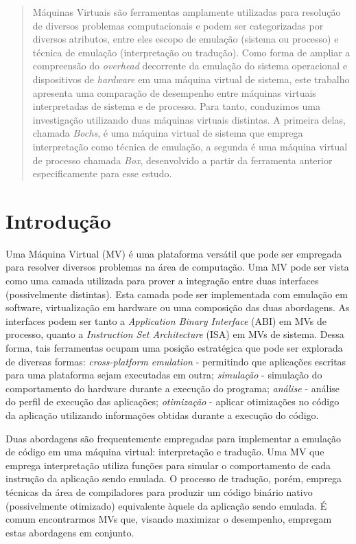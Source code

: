 \documentclass[11pt,twoside]{article}
\begin{document}
\begin{abstract} 
Máquinas Virtuais são ferramentas amplamente utilizadas para resolução de
diversos problemas computacionais e podem ser categorizadas por diversos
atributos, entre eles escopo de emulação (sistema ou processo) e técnica de
emulação (interpretação ou tradução). Como forma de ampliar a compreensão do
\emph{overhead} decorrente da emulação do sistema operacional e dispositivos de
\emph{hardware} em uma máquina virtual de sistema, este trabalho apresenta uma
comparação de desempenho entre máquinas virtuais interpretadas de sistema e de
processo.  Para tanto, conduzimos uma investigação utilizando duas máquinas
virtuais distintas.  A primeira delas, chamada \emph{Bochs}, é uma máquina
virtual de sistema que emprega interpretação como técnica de emulação, a segunda
é uma máquina virtual de processo chamada \emph{Box}, desenvolvido a partir da
ferramenta anterior especificamente para esse estudo.
\end{abstract}


\section{Introdução}
Uma Máquina Virtual (MV) é uma plataforma versátil que pode ser empregada para
resolver diversos problemas na área de computação.  Uma MV pode ser vista como
uma camada utilizada para prover a integração entre duas interfaces
(possivelmente distintas).  Esta camada pode ser implementada com emulação em
software, virtualização em hardware ou uma composição das duas abordagens.  As
interfaces podem ser tanto a \emph{Application Binary Interface} (ABI) em MVs de
processo, quanto a \emph{Instruction Set Architecture} (ISA) em MVs de sistema.
Dessa forma, tais ferramentas ocupam uma posição estratégica que pode ser
explorada de diversas formas: \emph{cross-platform emulation} - permitindo que
aplicações escritas para uma plataforma sejam executadas em outra;
\emph{simulação} - simulação do comportamento do hardware durante a execução
do programa; \emph{análise} - análise do perfil de execução das aplicações;
\emph{otimização} - aplicar otimizações no código da aplicação utilizando
informações obtidas durante a execução do código.

Duas abordagens são frequentemente empregadas para implementar a emulação de
código em uma máquina virtual: interpretação e tradução.  Uma MV que emprega
interpretação utiliza funções para simular o comportamento de cada instrução da
aplicação sendo emulada.  O processo de tradução, porém, emprega técnicas da área
de compiladores para produzir um código binário nativo (possivelmente otimizado)
equivalente àquele da aplicação sendo emulada.  É comum encontrarmos MVs que,
visando maximizar o desempenho, empregam estas abordagens em conjunto.
\end{document}
